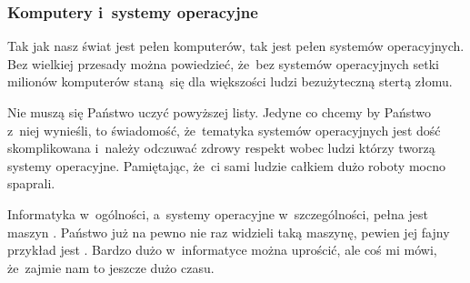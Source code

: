 \documentclass[10pt,t]{beamer}
\begin{document}
\begin{frame}
  \frametitle{Komputery i~systemy operacyjne}


  Tak jak nasz świat jest pełen komputerów, tak jest pełen systemów
  operacyjnych. Bez wielkiej przesady można powiedzieć, że~bez systemów
  operacyjnych setki milionów komputerów staną~się dla większości ludzi
  bezużyteczną stertą złomu.

  \alert{Nie} muszą się Państwo uczyć powyższej listy. Jedyne co chcemy by
  Państwo z~niej wynieśli, to świadomość, że~tematyka systemów operacyjnych
  jest dość skomplikowana i~należy odczuwać zdrowy respekt wobec
  ludzi którzy tworzą systemy operacyjne. Pamiętając, że~ci sami ludzie
  całkiem dużo roboty mocno spaprali.

  Informatyka w~ogólności, a~systemy operacyjne w~szczególności, pełna jest
  maszyn
  . Państwo już na pewno nie raz
  widzieli taką maszynę, pewien jej fajny przykład jest
  .
  Bardzo dużo w~informatyce można uprościć, ale coś mi mówi, że~zajmie nam
  to jeszcze dużo czasu.










\end{frame}
\end{document}
